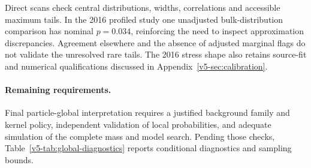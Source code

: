 Direct scans check central distributions, widths, correlations and
accessible maximum tails. In the 2016 profiled study one unadjusted
bulk-distribution comparison has nominal $p=0.034$, reinforcing the need
to inspect approximation discrepancies. Agreement elsewhere and the
absence of adjusted marginal flags do not validate the unresolved rare
tails. The 2016 stress shape also retains source-fit and numerical
qualifications discussed in Appendix~\ref{v5-sec:calibration}.

\enlargethispage{\baselineskip}
\paragraph{Remaining requirements.}
Final particle-global interpretation requires a justified background family
and kernel policy, independent validation of local probabilities, and adequate
simulation of the complete mass and model search. Pending those checks,
Table~\ref{v5-tab:global-diagnostics} reports conditional diagnostics and
sampling bounds.

